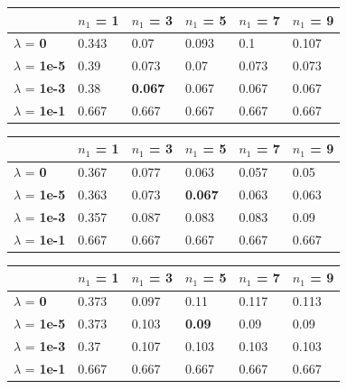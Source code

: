 \documentclass[10pt]{article}
\begin{document}
\begin{table}
\centering
\begin{tabular}{llllll}
\toprule
& $n_1$ = \bf{1} & $n_1$ =  \bf{3} & $n_1$ =  \bf{5} & $n_1$ =  \bf{7} & $n_1$ =  \bf{9} \\
\midrule
$\lambda$ = \bf{0} &      0.343 & 0.07  & 0.093 & 0.1   & 0.107 \\
$\lambda$ = \bf{1e-5} &   0.39  & 0.073 & 0.07  & 0.073 & 0.073 \\
$\lambda$ = \bf{1e-3} &  0.38  & \bf{0.067} & 0.067 & 0.067 & 0.067 \\
$\lambda$ = \bf{1e-1} &  0.667 & 0.667 & 0.667 & 0.667 & 0.667 \\
\bottomrule
\end{tabular}
\end{table}

\begin{table}
\centering
\begin{tabular}{llllll}
\toprule
& $n_1$ = \bf{1} & $n_1$ =  \bf{3} & $n_1$ =  \bf{5} & $n_1$ =  \bf{7} & $n_1$ =  \bf{9} \\
\midrule
$\lambda$ = \bf{0} &       0.367 & 0.077 & 0.063 & 0.057 & 0.05  \\
$\lambda$ = \bf{1e-5} &   0.363 & 0.073 & \bf{0.067} & 0.063 & 0.063 \\
$\lambda$ = \bf{1e-3} &   0.357 & 0.087 & 0.083 & 0.083 & 0.09  \\
$\lambda$ = \bf{1e-1} &   0.667 & 0.667 & 0.667 & 0.667 & 0.667 \\
\bottomrule
\end{tabular}
\end{table}
	
\begin{table}
\centering
\begin{tabular}{llllll}
\toprule
& $n_1$ = \bf{1} & $n_1$ =  \bf{3} & $n_1$ =  \bf{5} & $n_1$ =  \bf{7} & $n_1$ =  \bf{9} \\
\midrule
$\lambda$ = \bf{0} &        0.373 & 0.097 & 0.11  & 0.117 & 0.113 \\
$\lambda$ = \bf{1e-5} &    0.373 & 0.103 & \bf{0.09}  & 0.09  & 0.09  \\
$\lambda$ = \bf{1e-3} &    0.37  & 0.107 & 0.103 & 0.103 & 0.103 \\
$\lambda$ = \bf{1e-1} &    0.667 & 0.667 & 0.667 & 0.667 & 0.667 \\
\bottomrule
\end{tabular}
\end{table}
	
	
\end{document}
